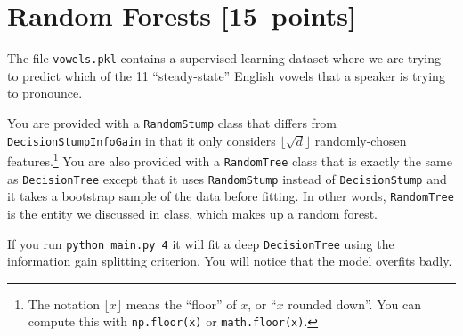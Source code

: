 \documentclass{article}
\newcommand\pts[1]{\textcolor{pointscolour}{[#1~points]}}
\begin{document}
    \clearpage
    \section{Random Forests \pts{15}}

    The file \texttt{vowels.pkl} contains a supervised learning dataset where we are trying to predict which of the 11 ``steady-state'' English vowels that a speaker is trying to pronounce.

    You are provided with a \texttt{RandomStump} class that differs from
    \texttt{DecisionStumpInfoGain} in that
    it only considers $\lfloor \sqrt{d} \rfloor$ randomly-chosen features.\footnote{The notation $\lfloor x\rfloor$ means the ``floor'' of $x$, or ``$x$ rounded down''. You can compute this with \texttt{np.floor(x)} or \texttt{math.floor(x)}.}
    You are also provided with a \texttt{RandomTree} class that is exactly the same as
    \texttt{DecisionTree} except that it uses \texttt{RandomStump} instead of
    \texttt{DecisionStump} and it takes a bootstrap sample of the data before fitting.
    In other words, \texttt{RandomTree} is the entity we discussed in class, which
    makes up a random forest.

    If you run \texttt{python main.py 4} it will fit a deep \texttt{DecisionTree}
    using the information gain splitting criterion. You will notice that the model overfits badly.
\end{document}
